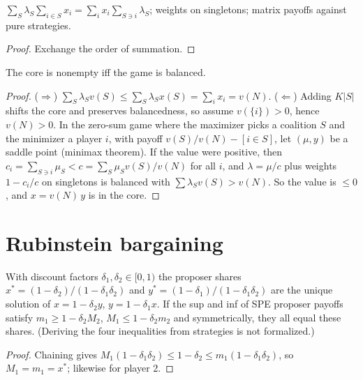 \begin{lemma}
\label{lem:core-aux}
\leanok
{}
$\sum_S \lambda_S \sum_{i \in S} x_i = \sum_i x_i \sum_{S \ni i} \lambda_S$; weights on singletons; matrix
payoffs against pure strategies.
\end{lemma}
\begin{proof}
\leanok
Exchange the order of summation.
\end{proof}

\begin{theorem}
\label{thm:bondareva-shapley}
\leanok
{}
The core is nonempty iff the game is balanced.
\end{theorem}
\begin{proof}
\leanok
($\Rightarrow$) $\sum_S \lambda_S v(S) \le \sum_S \lambda_S x(S) = \sum_i x_i = v(N)$.
($\Leftarrow$) Adding $K|S|$ shifts the core and preserves balancedness, so assume $v(\{i\}) > 0$, hence $v(N) > 0$.
In the zero-sum game where the maximizer picks a coalition $S$ and the minimizer a player $i$, with payoff
$v(S)/v(N) - [i \in S]$, let $(\mu, y)$ be a saddle point (minimax theorem). If the value were positive, then
$c_i = \sum_{S \ni i} \mu_S < c = \sum_S \mu_S v(S)/v(N)$ for all $i$, and $\lambda = \mu/c$ plus weights
$1 - c_i/c$ on singletons is balanced with $\sum \lambda_S v(S) > v(N)$. So the value is $\le 0$, and
$x = v(N)\,y$ is in the core.
\end{proof}

\section{Rubinstein bargaining}
\label{sec:rubinstein}

\begin{theorem}
\label{thm:rubinstein}
\leanok
With discount factors $\delta_1, \delta_2 \in [0,1)$ the proposer shares $x^* = (1-\delta_2)/(1-\delta_1\delta_2)$ and
$y^* = (1-\delta_1)/(1-\delta_1\delta_2)$ are the unique solution of $x = 1 - \delta_2 y$, $y = 1 - \delta_1 x$. If the sup and inf
of SPE proposer payoffs satisfy $m_1 \ge 1 - \delta_2 M_2$, $M_1 \le 1 - \delta_2 m_2$ and symmetrically, they all equal these
shares. (Deriving the four inequalities from strategies is not formalized.)
\end{theorem}
\begin{proof}
\leanok
Chaining gives $M_1(1 - \delta_1\delta_2) \le 1 - \delta_2 \le m_1(1-\delta_1\delta_2)$, so $M_1 = m_1 = x^*$; likewise for player 2.
\end{proof}

